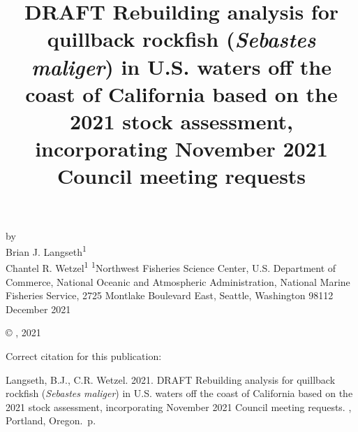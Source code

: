 \documentclass[11pt,
  english,
  letterpaper,
]{article}
\date{}
\newcommand{\trTitle}{DRAFT Rebuilding analysis for quillback rockfish (\emph{Sebastes maliger}) in U.S. waters off the coast of California based on the 2021 stock assessment, incorporating November 2021 Council meeting requests}
\newcommand{\trYear}{2021}
\newcommand{\trMonth}{December}
\newcommand{\trAuthsBack}{Langseth, B.J., C.R. Wetzel}
\newcommand{\trCitation}{
\begin{hangparas}{1em}{1}
\trAuthsBack{}. \trYear{}. \trTitle{}. \glsentrylong{pfmc}, Portland, Oregon. \pageref{LastPage}{}\,p.
\end{hangparas}}
\begin{document}

\renewcommand*{\thefootnote}{\fnsymbol{footnote}}

\small
\thispagestyle{empty}
\noindent
\begin{center}
\title{DRAFT Rebuilding analysis for quillback rockfish (\emph{Sebastes maliger}) in U.S. waters off the coast of California based on the 2021 stock assessment, incorporating November 2021 Council meeting requests}
\vspace{1.5cm}
{\Large\textbf{}}
\vfill
by\\
Brian J. Langseth\textsuperscript{1}\\
Chantel R. Wetzel\textsuperscript{1}\vfill
\textsuperscript{1}Northwest Fisheries Science Center, U.S. Department of Commerce, National Oceanic and Atmospheric Administration, National Marine Fisheries Service, 2725 Montlake Boulevard East, Seattle, Washington 98112\vfill
\trMonth{} \trYear{}
\end{center}
\clearpage

\thispagestyle{empty}
\vspace*{\fill}
\begin{center}
\copyright{} , \trYear{}\\
\end{center}
\par
\bigskip
\noindent
Correct citation for this publication:
\bigskip
\par
\trCitation{}
\clearpage


\tableofcontents\clearpage
\label{TRlastRoman}
\clearpage

\newpage
\thispagestyle{empty} %

\pagestyle{plain}  %
\renewcommand*{\thefootnote}{\arabic{footnote}}  %
\setcounter{footnote}{0}  %
\renewcommand{\headrulewidth}{0.5pt}
\renewcommand{\footrulewidth}{0.5pt}
\end{document}
